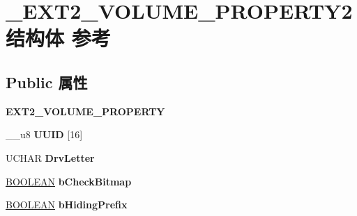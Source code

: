 \hypertarget{struct___e_x_t2___v_o_l_u_m_e___p_r_o_p_e_r_t_y2}{}\section{\+\_\+\+E\+X\+T2\+\_\+\+V\+O\+L\+U\+M\+E\+\_\+\+P\+R\+O\+P\+E\+R\+T\+Y2结构体 参考}
\label{struct___e_x_t2___v_o_l_u_m_e___p_r_o_p_e_r_t_y2}
\subsection*{Public 属性}
\begin{DoxyCompactItemize}
\item 
\mbox{\label{struct___e_x_t2___v_o_l_u_m_e___p_r_o_p_e_r_t_y2_a5c28ecf80a33b1cc9555ea411947477f}} 
{\bfseries E\+X\+T2\+\_\+\+V\+O\+L\+U\+M\+E\+\_\+\+P\+R\+O\+P\+E\+R\+TY}
\item 
\mbox{\label{struct___e_x_t2___v_o_l_u_m_e___p_r_o_p_e_r_t_y2_a31b6a59a44a06af01593e2ed7b369506}} 
\+\_\+\+\_\+u8 {\bfseries U\+U\+ID} \mbox{[}16\mbox{]}
\item 
\mbox{\label{struct___e_x_t2___v_o_l_u_m_e___p_r_o_p_e_r_t_y2_ae4e3a9ef35193d251db75602834dbcd8}} 
U\+C\+H\+AR {\bfseries Drv\+Letter}
\item 
\mbox{\label{struct___e_x_t2___v_o_l_u_m_e___p_r_o_p_e_r_t_y2_aabe5ace854ecaa927b7546de79624f2b}} 
\hyperlink{_processor_bind_8h_a112e3146cb38b6ee95e64d85842e380a}{B\+O\+O\+L\+E\+AN} {\bfseries b\+Check\+Bitmap}
\item 
\mbox{\label{struct___e_x_t2___v_o_l_u_m_e___p_r_o_p_e_r_t_y2_a389dd9e790b911857840ed1cb6d9ee79}} 
\hyperlink{_processor_bind_8h_a112e3146cb38b6ee95e64d85842e380a}{B\+O\+O\+L\+E\+AN} {\bfseries b\+Hiding\+Prefix}
\item 
\mbox{\label{struct___e_x_t2___v_o_l_u_m_e___p_r_o_p_e_r_t_y2_ac636057ff962ac1d5180c751e02948a7}} 

\end{DoxyCompactItemize}
